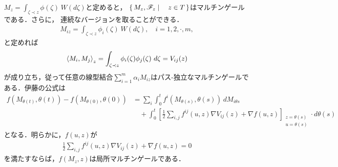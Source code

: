 	$M_{z} = \int_{\zeta \prec z} \phi(\zeta)\ W(d\zeta)$と定めると，
	$\left\{\, M_{z},\mathscr{F}_{z} \mid \quad z \in T\, \right\}$はマルチンゲールである．さらに，
	連続なバージョンを取ることができる．
	\begin{align}
		M_{iz} = \int_{\zeta \prec z} \phi_{i}(\zeta)\ W(d\zeta),
		\quad i = 1,2,\cdot,m,
	\end{align}
	と定めれば
	\begin{align}
		\inprod<M_{i},M_{j}>_{z} = 
		\int_{\zeta \prec z} \phi_{i}(\zeta) \phi_{j}(\zeta)\ d\zeta = V_{ij}(z)
	\end{align}
	が成り立ち，従って任意の線型結合$\sum_{i=1}^{m} \alpha_{i} M_{iz}$はパス-独立なマルチンゲールである．伊藤の公式は
	\begin{align}
		f\left(M_{\theta(t)},\theta(t)\right) - f\left(M_{\theta(0)},\theta(0)\right)
		&= \sum_{i} \int_{0}^{t} f^{i}\left(M_{\theta(s)},\theta(s)\right)\ dM_{i\theta{s}} \\
		&\quad + \int_{0}^{t} \left[\frac{1}{2} \sum_{i,j} f^{ij}(u,z) \nabla V_{ij}(z)
		+ \nabla f(u,z)\right]_{\substack{z=\theta(s) \\ u=\theta(s)}} \cdot d\theta(s)
	\end{align}
	となる．明らかに，$f(u,z)$が
	\begin{align}
		\frac{1}{2} \sum_{i,j} f^{ij}(u,z) \nabla V_{ij}(z) + \nabla f(u,z) = 0
	\end{align}
	を満たすならば，$f(M_{z},z)$は局所マルチンゲールである．
